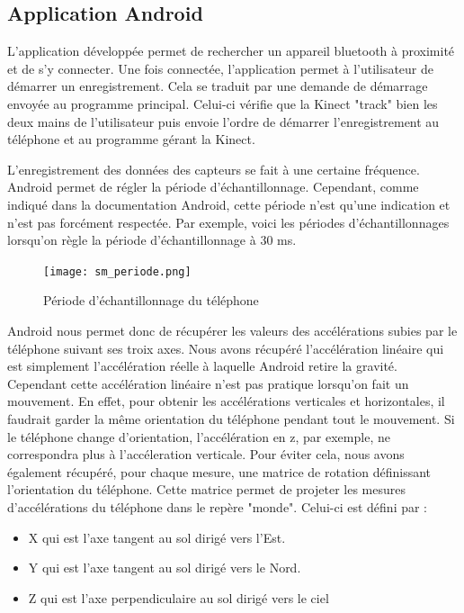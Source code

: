 \documentclass[12pt, french]{article}
\begin{document}
\subsection{Application Android}
L'application développée permet de rechercher un appareil bluetooth à proximité et de s'y connecter. Une fois connectée, l'application permet à l'utilisateur de démarrer un enregistrement. Cela se traduit par une demande de démarrage envoyée au programme principal. Celui-ci vérifie que la Kinect "track" bien les deux mains de l'utilisateur puis envoie  l'ordre de démarrer l'enregistrement au téléphone et au programme gérant la Kinect.

L'enregistrement des données des capteurs se fait à une certaine fréquence. Android permet de régler la période d'échantillonnage. Cependant, comme indiqué dans la documentation Android, cette période n'est qu'une indication et n'est pas forcément respectée. Par exemple, voici les périodes d'échantillonnages lorsqu'on règle la période d'échantillonnage à 30 ms.

\begin{figure}[H]
\centering
\texttt{[image: sm\_periode.png]}
\caption{Période d'échantillonnage du téléphone}
\label{fig1}
\end{figure}


Android nous permet donc de récupérer les valeurs des accélérations subies par le téléphone suivant ses troix axes. Nous avons récupéré l'accélération linéaire qui est simplement l'accélération réelle à laquelle Android retire la gravité. Cependant cette accélération linéaire n'est pas pratique lorsqu'on fait un mouvement. En effet, pour obtenir les accélérations verticales et horizontales, il faudrait garder la même orientation du téléphone pendant tout le mouvement. Si le téléphone change d'orientation, l'accélération en z, par exemple, ne correspondra plus à l'accéleration verticale. Pour éviter cela, nous avons également récupéré, pour chaque mesure, une matrice de rotation définissant l'orientation du téléphone. Cette matrice permet de projeter les mesures d'accélérations du téléphone dans le repère "monde". Celui-ci est défini par :
\begin{itemize}
\item X qui est l'axe tangent au sol dirigé vers l'Est.
\item Y qui est l'axe tangent au sol dirigé vers le Nord.
\item Z  qui  est l'axe perpendiculaire au sol dirigé vers le ciel
\end{itemize}
\end{document}
